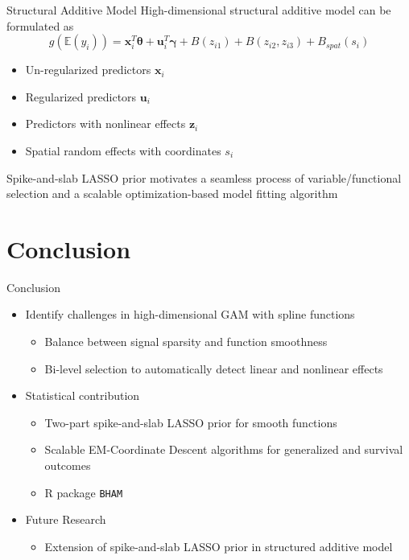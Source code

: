 \documentclass[
  ignorenonframetext,
  aspectratio=169]{beamer}
\providecommand{\tightlist}{%
  \setlength{\itemsep}{0pt}\setlength{\parskip}{0pt}}
\newcommand{\bs}[1]{\boldsymbol{#1}}
\begin{document}
\begin{frame}{Structural Additive Model}
\protect\hypertarget{structural-additive-model}{}
High-dimensional structural additive model can be formulated as \[
g(\mathbb{E}(y_i)) = \bs x_i^T \bs \theta + \bs u_i^T \bs \gamma + B(z_{i1}) + B(z_{i2}, z_{i3}) + B_{spat}(s_i)
\]

\begin{itemize}
\tightlist
\item
  Un-regularized predictors \(\bs x_i\)
\item
  Regularized predictors \(\bs u_i\)
\item
  Predictors with nonlinear effects \(\bs z_i\)
\item
  Spatial random effects with coordinates \(s_i\)
\end{itemize}

Spike-and-slab LASSO prior motivates a seamless process of
variable/functional selection and a scalable optimization-based model
fitting algorithm
\end{frame}

\hypertarget{conclusion}{%
\section{Conclusion}\label{conclusion}}

\begin{frame}[fragile]{Conclusion}
\begin{itemize}
\tightlist
\item
  Identify challenges in high-dimensional GAM with spline functions

  \begin{itemize}
  \tightlist
  \item
    Balance between signal sparsity and function smoothness
  \item
    Bi-level selection to automatically detect linear and nonlinear
    effects
  \end{itemize}
\item
  Statistical contribution

  \begin{itemize}
  \tightlist
  \item
    Two-part spike-and-slab LASSO prior for smooth functions
  \item
    Scalable EM-Coordinate Descent algorithms for generalized and
    survival outcomes
  \item
    R package \texttt{BHAM}
  \end{itemize}
\item
  Future Research

  \begin{itemize}
  \tightlist
  \item
    Extension of spike-and-slab LASSO prior in structured additive model
  \end{itemize}
\end{itemize}
\end{frame}
\end{document}
